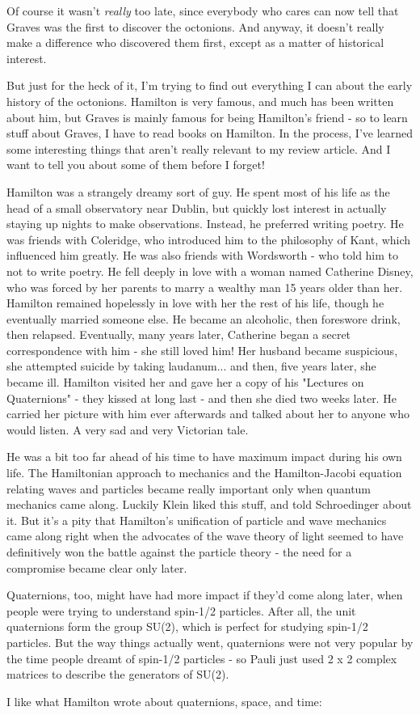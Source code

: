 Of course it wasn't \emph{really} too late, since everybody who cares 
can now tell that Graves was the first to discover the octonions.  
And anyway, it doesn't really make a difference who discovered them 
first, except as a matter of historical interest.  

But just for the heck of it, I'm trying to find out everything I can 
about the early history of the octonions.  Hamilton is very famous, and 
much has been written about him, but Graves is mainly famous for being 
Hamilton's friend - so to learn stuff about Graves, I have to read books 
on Hamilton.   In the process, I've learned some interesting things that 
aren't really relevant to my review article.  And I want to tell you about 
some of them before I forget! 

Hamilton was a strangely dreamy sort of guy.  He spent most of his
life as the head of a small observatory near Dublin, but quickly lost
interest in actually staying up nights to make observations.  Instead,
he preferred writing poetry.  He was friends with Coleridge, who 
introduced him to the philosophy of Kant, which influenced him greatly.
He was also friends with Wordsworth - who told him to not to write poetry.  
He fell deeply in love with a woman named Catherine Disney, who was forced 
by her parents to marry a wealthy man 15 years older than her.  Hamilton
remained hopelessly in love with her the rest of his life, though he 
eventually married someone else.  He became an alcoholic, then foreswore 
drink, then relapsed.  Eventually, many years later, Catherine began a 
secret correspondence with him - she still loved him!  Her husband became 
suspicious, she attempted suicide by taking laudanum... and then, five 
years later, she became ill.   Hamilton visited her and gave her a copy of 
his "Lectures on Quaternions" - they kissed at long last - and 
then she died two weeks later.  He carried her picture with him ever 
afterwards and talked about her to anyone who would listen.   A very 
sad and very Victorian tale.  

He was a bit too far ahead of his time to have maximum impact during his 
own life.  The Hamiltonian approach to mechanics and the Hamilton-Jacobi 
equation relating waves and particles became really important only when 
quantum mechanics came along.  Luckily Klein liked this stuff, and told 
Schroedinger about it.  But it's a pity that Hamilton's unification of 
particle and wave mechanics came along right when the advocates of the
wave theory of light seemed to have definitively won the battle against 
the particle theory - the need for a compromise became clear only later.  

Quaternions, too, might have had more impact if they'd come along later,
when people were trying to understand spin-1/2 particles.  After all, 
the unit quaternions form the group SU(2), which is perfect for studying
spin-1/2 particles.   But the way things actually went, quaternions were 
not very popular by the time people dreamt of spin-1/2 particles - so 
Pauli just used 2 x 2 complex matrices to describe the generators of SU(2).   

I like what Hamilton wrote about quaternions, space, and time:



